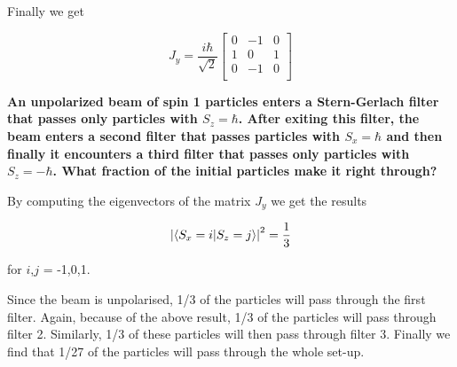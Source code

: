 \begin{alphaparts}
Finally we get

\begin{equation}
    J_y = 
    \frac{i \hbar}{\sqrt{2}}
    \begin{bmatrix}
    0 & -1 & 0 \\
    1 & 0 & 1 \\
    0 & -1 & 0 \\
    \end{bmatrix}
\end{equation}

\questionpart 
\textbf{An unpolarized beam of spin 1 particles enters a Stern-Gerlach filter
that passes only particles with $S_z = \hbar$. After exiting this filter, the beam 
enters a second filter that passes particles with $S_x = \hbar$ and then finally it 
encounters a third filter that passes only particles with $S_z = -\hbar$.  
What fraction of the initial particles make it right through?}

By computing the eigenvectors of the matrix $J_y$ we get the results

\begin{equation}
    \abs{\braket{S_x = i}{S_z = j}}^2 = \frac{1}{3}
\end{equation}

for $i$,$j$ = -1,0,1.

Since the beam is unpolarised, 1/3 of the particles will pass through the first filter. Again, because of the above result, 1/3 of the particles will pass through filter 2. Similarly, 1/3 of these particles will then pass through filter 3. Finally we find that 1/27 of the particles will pass through the whole set-up. 



\end{alphaparts}
